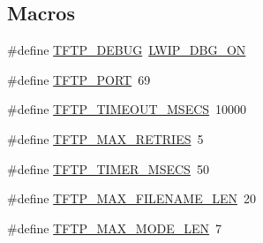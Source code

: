 \subsection*{Macros}
\begin{DoxyCompactItemize}
\item 
\#define \hyperlink{group__tftp__opts_ga2dd54a1d0c3006527b8a7a8604b81981}{T\+F\+T\+P\+\_\+\+D\+E\+B\+UG}~\hyperlink{group__debugging__levels_ga9e31b7cbbc8f46af8e62b548079acd4e}{L\+W\+I\+P\+\_\+\+D\+B\+G\+\_\+\+ON}
\item 
\#define \hyperlink{group__tftp__opts_gad9230620a5d3bb87a7ac280ff99875d1}{T\+F\+T\+P\+\_\+\+P\+O\+RT}~69
\item 
\#define \hyperlink{group__tftp__opts_ga36986e5465dc2ccb6184fc57f9a37d63}{T\+F\+T\+P\+\_\+\+T\+I\+M\+E\+O\+U\+T\+\_\+\+M\+S\+E\+CS}~10000
\item 
\#define \hyperlink{group__tftp__opts_ga6a01757ad942eb602e8a87e2be42d313}{T\+F\+T\+P\+\_\+\+M\+A\+X\+\_\+\+R\+E\+T\+R\+I\+ES}~5
\item 
\#define \hyperlink{group__tftp__opts_ga3e6caacb3f4d43f780b2d68ffe4258ea}{T\+F\+T\+P\+\_\+\+T\+I\+M\+E\+R\+\_\+\+M\+S\+E\+CS}~50
\item 
\#define \hyperlink{group__tftp__opts_ga8e975900b4397313f1a649ff76a3063b}{T\+F\+T\+P\+\_\+\+M\+A\+X\+\_\+\+F\+I\+L\+E\+N\+A\+M\+E\+\_\+\+L\+EN}~20
\item 
\#define \hyperlink{group__tftp__opts_gaa8a449c25e37be757f5efccd422c9055}{T\+F\+T\+P\+\_\+\+M\+A\+X\+\_\+\+M\+O\+D\+E\+\_\+\+L\+EN}~7
\end{DoxyCompactItemize}
